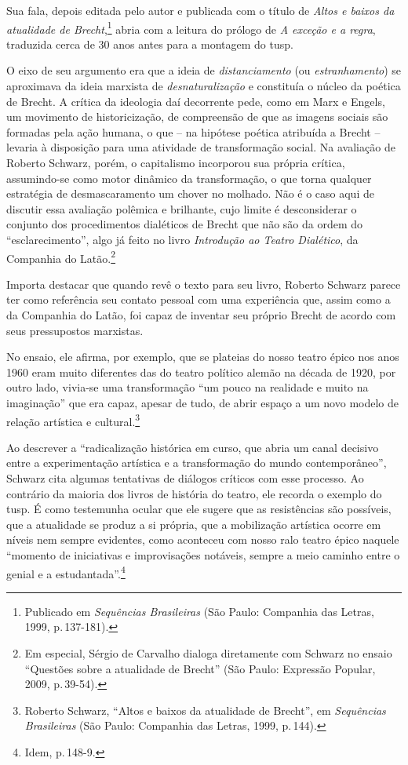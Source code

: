 Sua fala, depois editada pelo autor e publicada com o título de
{\it Altos e baixos da atualidade de Brecht},\footnote{Publicado em
  {\it Sequências Brasileiras} (São Paulo: Companhia das Letras, 1999,
  p.\,137-181).} abria com a leitura do prólogo de {\it A exceção e a
regra}, traduzida cerca de 30 anos antes para a montagem do {\sc tusp}.

O eixo de seu argumento era que a ideia de {\it distanciamento} (ou
{\it estranhamento}) se aproximava da ideia marxista de
{\it desnaturalização} e constituía o núcleo da poética de Brecht. A
crítica da ideologia daí decorrente pede, como em Marx e Engels, um
movimento de historicização, de compreensão de que as imagens sociais
são formadas pela ação humana, o que -- na hipótese poética atribuída a
Brecht -- levaria à disposição para uma atividade de transformação
social. Na avaliação de Roberto Schwarz, porém, o capitalismo incorporou
sua própria crítica, assumindo-se como motor dinâmico da transformação,
o que torna qualquer estratégia de desmascaramento um chover no molhado.
Não é o caso aqui de discutir essa avaliação polêmica e brilhante, cujo
limite é desconsiderar o conjunto dos procedimentos dialéticos de Brecht
que não são da ordem do “esclarecimento”, algo já feito no livro
{\it Introdução ao Teatro Dialético}, da Companhia do Latão.\footnote{Em
  especial, Sérgio de Carvalho dialoga diretamente com Schwarz no ensaio
  “Questões sobre a atualidade de Brecht” (São Paulo: Expressão Popular,
  2009, p.\,39-54).}

Importa destacar que quando revê o texto para seu livro, Roberto Schwarz
parece ter como referência seu contato pessoal com uma experiência que,
assim como a da Companhia do Latão, foi capaz de inventar seu próprio
Brecht de acordo com seus pressupostos marxistas.

No ensaio, ele afirma, por exemplo, que se plateias do nosso teatro
épico nos anos 1960 eram muito diferentes das do teatro político alemão
na década de 1920, por outro lado, vivia-se uma transformação “um pouco
na realidade e muito na imaginação” que era capaz, apesar de tudo, de
abrir espaço a um novo modelo de relação artística e
cultural.\footnote{Roberto Schwarz, “Altos e baixos da atualidade de
  Brecht”, em {\it Sequências Brasileiras} (São Paulo: Companhia das
  Letras, 1999, p.\,144).}

Ao descrever a “radicalização histórica em curso, que abria um canal
decisivo entre a experimentação artística e a transformação do mundo
contemporâneo”, Schwarz cita algumas tentativas de diálogos críticos com
esse processo. Ao contrário da maioria dos livros de história do teatro,
ele recorda o exemplo do {\sc tusp}. É como testemunha ocular que ele sugere
que as resistências são possíveis, que a atualidade se produz a si
própria, que a mobilização artística ocorre em níveis nem sempre
evidentes, como aconteceu com nosso ralo teatro épico naquele “momento
de iniciativas e improvisações notáveis, sempre a meio caminho entre o
genial e a estudantada”.\footnote{Idem, p.\,148-9.}

